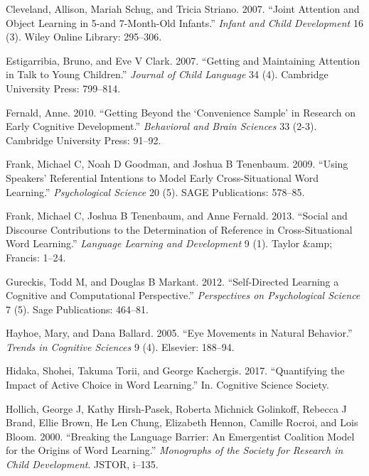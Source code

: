 \documentclass[10pt, letterpaper]{article}
\begin{document}
\leavevmode\hypertarget{ref-cleveland2007joint}{}%
Cleveland, Allison, Mariah Schug, and Tricia Striano. 2007. ``Joint
Attention and Object Learning in 5-and 7-Month-Old Infants.''
\emph{Infant and Child Development} 16 (3). Wiley Online Library:
295--306.

\leavevmode\hypertarget{ref-estigarribia2007getting}{}%
Estigarribia, Bruno, and Eve V Clark. 2007. ``Getting and Maintaining
Attention in Talk to Young Children.'' \emph{Journal of Child Language}
34 (4). Cambridge University Press: 799--814.

\leavevmode\hypertarget{ref-fernald2010getting}{}%
Fernald, Anne. 2010. ``Getting Beyond the `Convenience Sample' in
Research on Early Cognitive Development.'' \emph{Behavioral and Brain
Sciences} 33 (2-3). Cambridge University Press: 91--92.

\leavevmode\hypertarget{ref-frank2009using}{}%
Frank, Michael C, Noah D Goodman, and Joshua B Tenenbaum. 2009. ``Using
Speakers' Referential Intentions to Model Early Cross-Situational Word
Learning.'' \emph{Psychological Science} 20 (5). SAGE Publications:
578--85.

\leavevmode\hypertarget{ref-frank2013social}{}%
Frank, Michael C, Joshua B Tenenbaum, and Anne Fernald. 2013. ``Social
and Discourse Contributions to the Determination of Reference in
Cross-Situational Word Learning.'' \emph{Language Learning and
Development} 9 (1). Taylor \&amp; Francis: 1--24.

\leavevmode\hypertarget{ref-gureckis2012self}{}%
Gureckis, Todd M, and Douglas B Markant. 2012. ``Self-Directed Learning
a Cognitive and Computational Perspective.'' \emph{Perspectives on
Psychological Science} 7 (5). Sage Publications: 464--81.

\leavevmode\hypertarget{ref-hayhoe2005eye}{}%
Hayhoe, Mary, and Dana Ballard. 2005. ``Eye Movements in Natural
Behavior.'' \emph{Trends in Cognitive Sciences} 9 (4). Elsevier:
188--94.

\leavevmode\hypertarget{ref-hidaka2017quantifying}{}%
Hidaka, Shohei, Takuma Torii, and George Kachergis. 2017. ``Quantifying
the Impact of Active Choice in Word Learning.'' In. Cognitive Science
Society.

\leavevmode\hypertarget{ref-hollich2000breaking}{}%
Hollich, George J, Kathy Hirsh-Pasek, Roberta Michnick Golinkoff,
Rebecca J Brand, Ellie Brown, He Len Chung, Elizabeth Hennon, Camille
Rocroi, and Lois Bloom. 2000. ``Breaking the Language Barrier: An
Emergentist Coalition Model for the Origins of Word Learning.''
\emph{Monographs of the Society for Research in Child Development}.
JSTOR, i--135.
\end{document}
